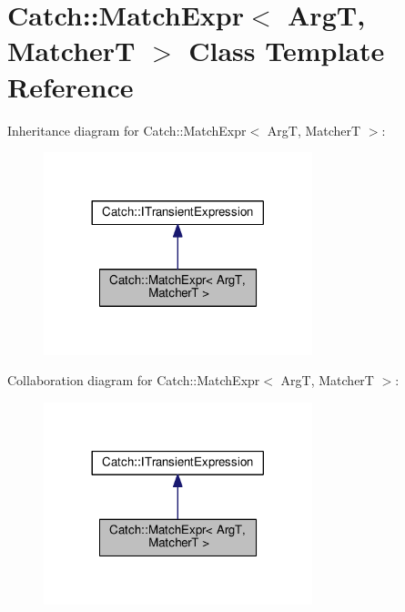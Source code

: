 \hypertarget{classCatch_1_1MatchExpr}{}\section{Catch\+:\+:Match\+Expr$<$ ArgT, MatcherT $>$ Class Template Reference}
\label{classCatch_1_1MatchExpr}


Inheritance diagram for Catch\+:\+:Match\+Expr$<$ ArgT, MatcherT $>$\+:\nopagebreak
\begin{figure}[H]
\begin{center}
\leavevmode
\includegraphics[width=221pt]{classCatch_1_1MatchExpr__inherit__graph}
\end{center}
\end{figure}


Collaboration diagram for Catch\+:\+:Match\+Expr$<$ ArgT, MatcherT $>$\+:\nopagebreak
\begin{figure}[H]
\begin{center}
\leavevmode
\includegraphics[width=221pt]{classCatch_1_1MatchExpr__coll__graph}
\end{center}
\end{figure}
